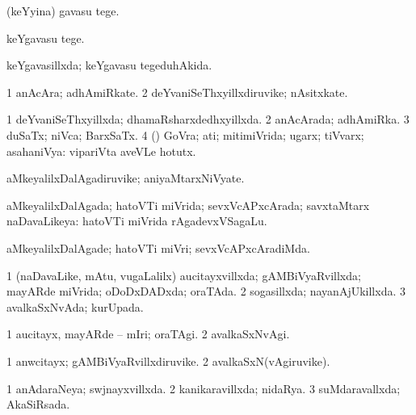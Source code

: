 {\bentry
{} 
\gl{\sakirx}
\expl{}
\bmng
 (keYyina) gavasu tege. 
\emng

\noindent
\gl{\akirx}
\expl{}
\bmng
keYgavasu tege. 
\emng
\eentry

\bentry
{} 
\gl{\gu}
\expl{}
\bmng
 keYgavasillxda; keYgavasu tegeduhAkida. 
\emng
\eentry

\bentry
{} 
\gl{\nA}
\expl{}
\bmng
\bnum
\num{1} anAcAra; adhAmiRkate. 
\num{2} deYvaniSeThxyillxdiruvike; nAsitxkate. 
\enum
\emng
\eentry

\bentry
{} 
\gl{\gu}
\bmng
\bnum
\num{1} deYvaniSeThxyillxda; dhamaRsharxdedhxyillxda. 
\num{2} anAcArada; adhAmiRka. 
\num{3} duSaTx; niVca; BarxSaTx. 
\num{4} (\AmA) GoVra; ati; mitimiVrida; ugarx; tiVvarx; asahaniVya:  vipariVta aveVLe hotutx. 
\enum
\emng
\eentry

\bentry
{} 
\gl{\nA}
\expl{}
\bmng
 aMkeyalilxDalAgadiruvike; aniyaMtarxNiVyate. 
\emng
\eentry

\bentry
{} 
\gl{\gu}
\expl{}
\bmng
 aMkeyalilxDalAgada; hatoVTi miVrida; sevxVcAPxcArada; savxtaMtarx naDavaLikeya:  hatoVTi miVrida rAgadevxVSagaLu. 
\emng
\eentry

\bentry
{} 
\gl{\kirxvi}
\expl{}
\bmng
 aMkeyalilxDalAgade; hatoVTi miVri; sevxVcAPxcAradiMda. 
\emng
\eentry

\bentry
{} 
\gl{\gu}
\expl{}
\bmng
\bnum
\num{1} (naDavaLike, mAtu, \mo vugaLalilx) aucitayxvillxda; gAMBiVyaRvillxda; mayARde miVrida; oDoDxDADxda; oraTAda. 
\num{2} sogasillxda; nayanAjUkillxda. 
\num{3} avalkaSxNvAda; kurUpada. 
\enum
\emng
\eentry

\bentry
{} 
\gl{\kirxvi}
\expl{}
\bmng
\bnum
\num{1} aucitayx, mayARde -- mIri; oraTAgi. 
\num{2} avalkaSxNvAgi. 
\enum
\emng
\eentry

\bentry
{} 
\gl{\nA}
\expl{}
\bmng
\bnum
\num{1} anwcitayx; gAMBiVyaRvillxdiruvike. 
\num{2} avalkaSxN(vAgiruvike). 
\enum
\emng
\eentry

\bentry
{} 
\gl{\gu}
\expl{}
\bmng
\bnum
\num{1} anAdaraNeya; swjnayxvillxda. 
\num{2} kanikaravillxda; nidaRya.
\num{3} suMdaravallxda; AkaSiRsada. 
\enum
\emng
\eentry

}

